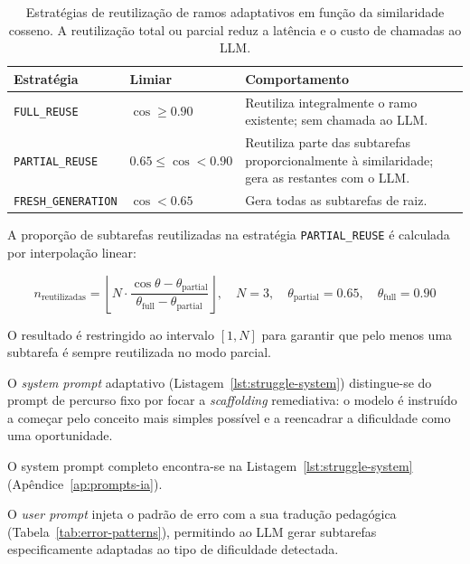 \begin{table}[htbp]
	\centering
	\small
	\begin{tabular}{p{3.2cm} p{3.0cm} p{5.9cm}}
		\toprule
		\textbf{Estrat\'egia} & \textbf{Limiar} & \textbf{Comportamento} \\
		\midrule
		\texttt{FULL\_REUSE} &
			$\cos \geq 0.90$ &
			Reutiliza integralmente o ramo existente; sem chamada ao LLM. \\
		\texttt{PARTIAL\_REUSE} &
			$0.65 \leq \cos < 0.90$ &
			Reutiliza parte das subtarefas proporcionalmente \`a similaridade;
			gera as restantes com o LLM. \\
		\texttt{FRESH\_GENERATION} &
			$\cos < 0.65$ &
			Gera todas as subtarefas de raiz. \\
		\bottomrule
	\end{tabular}
	\caption[Estrat\'egias de reutiliza\c{c}\~ao na gera\c{c}\~ao adaptativa]{Estrat\'egias de reutiliza\c{c}\~ao de ramos adaptativos em fun\c{c}\~ao da similaridade cosseno. A reutiliza\c{c}\~ao total ou parcial reduz a lat\^encia e o custo de chamadas ao LLM.}
	\label{tab:reuse-strategy}
\end{table}

A propor\c{c}\~ao de subtarefas reutilizadas na estrat\'egia
\texttt{PARTIAL\_REUSE} \'e calculada por interpola\c{c}\~ao linear:

\begin{equation}
	n_{\text{reutilizadas}} = \left\lfloor
		N \cdot \frac{\cos\theta - \theta_{\text{partial}}}{\theta_{\text{full}} - \theta_{\text{partial}}}
	\right\rfloor, \quad
	N = 3,\quad
	\theta_{\text{partial}} = 0.65,\quad
	\theta_{\text{full}} = 0.90
	\label{eq:partial-reuse}
\end{equation}

O resultado \'e restringido ao intervalo $[1, N]$ para garantir que pelo menos
uma subtarefa \'e sempre reutilizada no modo parcial.

\begin{sloppypar}
O \emph{system prompt} adaptativo (Listagem~\ref{lst:struggle-system})
distingue-se do prompt de percurso fixo por focar a \emph{scaffolding}
remediativa: o modelo \'e instru\'ido a come\c{c}ar pelo conceito mais
simples poss\'ivel e a reencadrar a dificuldade como uma oportunidade.
\end{sloppypar}

O system prompt completo encontra-se na Listagem~\ref{lst:struggle-system}
(Ap\^endice~\ref{ap:prompts-ia}).

O \emph{user prompt} injeta o padr\~ao de erro com a sua tradu\c{c}\~ao
pedag\'ogica (Tabela~\ref{tab:error-patterns}), permitindo ao LLM gerar
subtarefas especificamente adaptadas ao tipo de dificuldade detectada.

